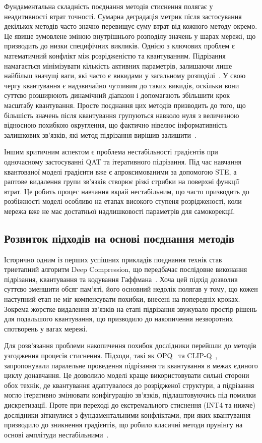 \documentclass{pma-mthesis}
\begin{document}
Фундаментальна складність поєднання методів стиснення полягає у неадитивності втрат точності. Сумарна деградація метрик після застосування декількох методів часто значно перевищує суму втрат від кожного методу окремо. Це явище зумовлене зміною внутрішнього розподілу значень у шарах мережі, що призводить до низки специфічних викликів. Однією з ключових проблем є математичний конфлікт між розрідженістю та квантуванням. Підрізання намагається мінімізувати кількість активних параметрів, залишаючи лише найбільш значущі ваги, які часто є викидами у загальному розподілі~\cite{Han2016DeepCompression}. У свою чергу квантування є надзвичайно чутливим до таких викидів, оскільки вони суттєво розширюють динамічний діапазон і допомагають збільшити крок масштабу квантування. Просте поєднання цих методів призводить до того, що більшість значень після квантування групуються навколо нуля з величезною відносною похибкою округлення, що фактично нівелює інформативність залишкових зв'язків, які метод підрізання вирішив залишити~\cite{Han2016DeepCompression}.

Іншим критичним аспектом є проблема нестабільності градієнтів при одночасному застосуванні QAT та ітеративного підрізання. Під час навчання квантованої моделі градієнти вже є апроксимованими за допомогою STE, а раптове видалення групи зв’язків створює різкі стрибки на поверхні функції втрат. Це робить процес навчання вкрай нестабільним, що часто призводить до розбіжності моделі особливо на етапах високого ступеня розрідженості, коли мережа вже не має достатньої надлишковості параметрів для самокорекції.

\subsection{Розвиток підходів на основі поєднання методів}
Історично одним із перших успішних прикладів поєднання технік став триетапний алгоритм Deep Compression, що передбачає послідовне виконання підрізання, квантування та кодування Гаффмана~\cite{Han2016DeepCompression}. Хоча цей підхід дозволив суттєво зменшити обсяг пам'яті, його основний недолік полягав у тому, що кожен наступний етап не міг компенсувати похибки, внесені на попередніх кроках. Зокрема жорстке видалення зв'язків на етапі підрізання звужувало простір рішень для подальшого квантування, що призводило до накопичення незворотних спотворень у вагах мережі.

Для розв'язання проблеми накопичення похибок дослідники перейшли до методів узгодження процесів стиснення. Підходи, такі як OPQ~\cite{hu2021opq} та CLIP-Q~\cite{8578919}, запропонували паралельне проведення підрізання та квантування в межах єдиного циклу донавчання. Це дозволило моделі краще використовувати сильні сторони обох технік, де квантування адаптувалося до розрідженої структури, а підрізання могло ітеративно змінювати конфігурацію зв'язків, підлаштовуючись під помилки дискретизації. Проте при переході до екстремального стиснення (INT4 та нижче) дослідники зіткнулися з фундаментальними конфліктами, при яких квантування призводило до зникнення градієнтів, що робило класичні методи прунінгу на основі амплітуди нестабільними~\cite{dettmers2022gpt3}.
\end{document}
